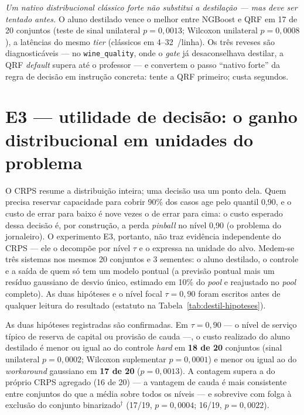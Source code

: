 \emph{Um nativo distribucional clássico forte não substitui a
destilação --- mas deve ser tentado antes.} O aluno destilado vence o
melhor entre NGBoost e QRF em 17 de 20 conjuntos (teste de sinal
unilateral
$p=0{,}0013$; Wilcoxon unilateral $p=0{,}0008$), a latências do mesmo \emph{tier}
(clássicos em 4--32~\us/linha). Os três reveses são diagnosticáveis
--- no \texttt{wine\_quality}, onde o \emph{gate} já desaconselhava destilar,
a QRF \emph{default} supera até o professor --- e convertem o passo ``nativo
forte'' da regra de decisão em instrução concreta: tente a QRF
primeiro; custa segundos.

\section{E3 --- utilidade de decisão: o ganho distribucional em
unidades do problema}
\label{sec:destil-e3}

O CRPS resume a distribuição inteira; uma decisão usa um ponto
dela. Quem precisa reservar capacidade para cobrir 90\% dos casos age
pelo quantil 0,90, e o custo de errar para baixo é nove vezes o de
errar para cima: o custo esperado dessa decisão é, por construção, a
perda \emph{pinball} no nível 0,90 (o problema do jornaleiro). O
experimento E3, portanto, não traz evidência independente do CRPS ---
ele o decompõe por nível $\tau$ e o expressa na unidade do alvo. Medem-se
três sistemas nos mesmos 20 conjuntos e 3 sementes: o aluno destilado,
o controle e a saída de quem só tem um modelo pontual (a previsão
pontual mais um resíduo gaussiano de desvio único, estimado em 10\%
do \emph{pool} e reajustado no \emph{pool} completo). As duas
hipóteses e o nível focal $\tau{=}0{,}90$ foram escritos antes de
qualquer leitura do resultado (estatuto na
Tabela~\ref{tab:destil-hipoteses}).

As duas hipóteses registradas são confirmadas. Em
$\tau{=}0{,}90$ --- o nível de serviço típico de reserva de capital ou
provisão de cauda ---, o custo realizado do aluno destilado é menor ou
igual ao do controle \emph{hard} em \textbf{18 de 20} conjuntos
(sinal unilateral $p{=}0{,}0002$; Wilcoxon suplementar $p{=}0{,}0001$)
e menor ou igual ao do \emph{workaround} gaussiano em \textbf{17 de
20} ($p{=}0{,}0013$). A contagem supera a do próprio CRPS agregado
(16 de 20) --- a vantagem de cauda é mais consistente entre
conjuntos do que a média sobre todos os níveis --- e sobrevive com
folga à exclusão do conjunto binarizado$^\dagger$ (17/19,
$p{=}0{,}0004$; 16/19, $p{=}0{,}0022$).

